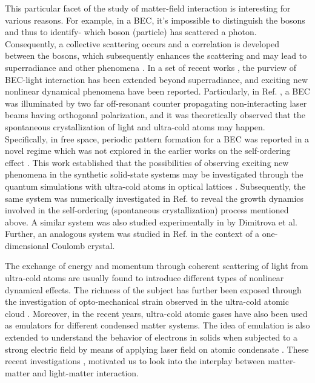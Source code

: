 \documentclass[epj]{svjour}
\begin{document}
This particular facet of the study of matter-field interaction is interesting for various reasons. For example,  in a BEC, it's impossible to distinguish the bosons and thus to identify- which boson (particle) has scattered a photon. Consequently, a collective scattering occurs and a correlation is developed between the bosons, which subsequently enhances the scattering and may lead to superradiance \cite{Superradiance1,Superradiance2,Superradiance3,Superradiance4,nagy2008self,das2016collectively} and other phenomena \cite{saidi2018ultrastrong,dimitrova,ma2017rabi}. In a set of recent works \cite{dimitrova,ritsch1,ritsch2}, the purview of BEC-light interaction has been extended beyond superradiance, and exciting new nonlinear dynamical phenomena have been reported. Particularly, in Ref. \cite{ritsch1}, a BEC was illuminated by two far off-resonant counter propagating non-interacting laser beams having orthogonal polarization, and it was theoretically observed that the spontaneous crystallization of light and ultra-cold atoms may happen. Specifically, in free space, periodic pattern formation for a BEC was reported in a novel regime which was not explored in the earlier works on the self-ordering effect \cite{selfordering1,selfordering2,selfordering3}. This work established that the possibilities of observing exciting new phenomena in the synthetic solid-state systems may be investigated through the quantum simulations with ultra-cold atoms in optical
lattices \cite{ritsch1}. Subsequently, the same system was numerically investigated in Ref. \cite{ritsch2} to reveal the growth dynamics involved in the self-ordering (spontaneous crystallization) process mentioned above. A similar system was also studied experimentally in \cite{dimitrova} by Dimitrova et al. Further, an analogous system was studied in Ref. \cite{schmidt2018} in the context of a one-dimensional Coulomb crystal.


The exchange of energy and momentum through coherent scattering of light from ultra-cold atoms are usually found to introduce different types of nonlinear dynamical effects. The richness of the subject has further been exposed through the investigation of opto-mechanical strain observed in the ultra-cold atomic cloud \cite{davidson}. Moreover, in the recent years, ultra-cold atomic gases have also been used as emulators for different condensed matter systems. The idea of emulation is also extended to understand the behavior of electrons in solids when subjected to a strong electric field by means of applying laser field on atomic condensate \cite{rajagopal1,rajagopal2}. These recent investigations \cite{dimitrova,ritsch1,ritsch2,schmidt2018}, motivated us to look into the interplay between matter-matter and light-matter interaction.
\end{document}
